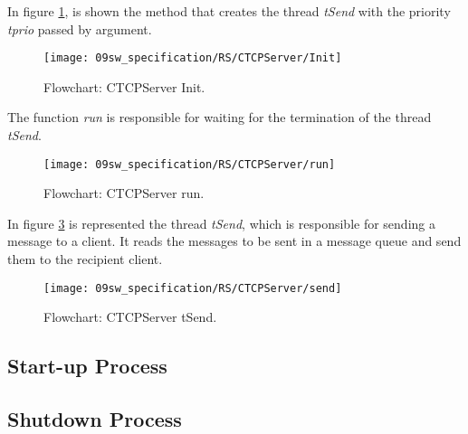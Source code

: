In figure \ref{fig:RSInit}, is shown the method that creates the thread \textit{tSend} with the priority \textit{tprio} passed by argument.

\begin{figure}[H]
	\centering
	\texttt{[image: 09sw\_specification/RS/CTCPServer/Init]}
	\caption{Flowchart: CTCPServer Init.}
	\label{fig:RSInit}
\end{figure}

The function \textit{run} is responsible for waiting for the termination of the thread \textit{tSend}.

\begin{figure}[H]
	\centering
	\texttt{[image: 09sw\_specification/RS/CTCPServer/run]}
	\caption{Flowchart: CTCPServer run.}
	\label{fig:RSrun}
\end{figure}

In figure \ref{fig:RSsend} is represented the thread \textit{tSend}, which is responsible for sending a message to a client. It reads the messages to be sent in a message queue and send them to the recipient client.

\begin{figure}[H]
	\centering
	\texttt{[image: 09sw\_specification/RS/CTCPServer/send]}
	\caption{Flowchart: CTCPServer tSend.}
	\label{fig:RSsend}
\end{figure}

\subsection{Start-up Process}

\subsection{Shutdown Process}

